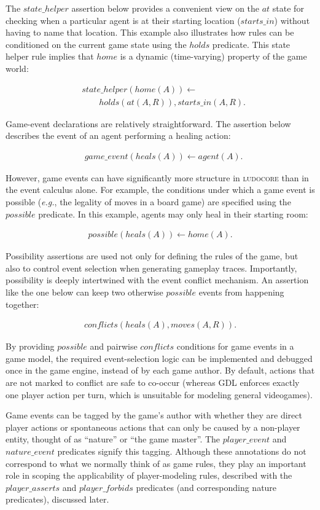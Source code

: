 \documentclass[conference]{IEEEtran}
\newcommand{\ludocore}{\textsc{ludocore}}
\newcommand{\snippet}[1]{{\vspace{-0.4cm}\begin{align*}#1\end{align*}\vspace{-0.4cm}}}
\newcommand{\logical}[1]{$#1$}
\begin{document}
The \logical{state\_helper} assertion below provides a convenient view on the
\logical{at} state for checking when a particular agent is at their starting
location (\logical{starts\_in}) without having to name that location. This
example also illustrates how rules can be conditioned on the current game state
using the \logical{holds} predicate. This state helper rule implies that
\logical{home} is a dynamic (time-varying) property of the game world:

\snippet{&state\_helper(home(A)) \leftarrow\\&\qquad holds(at(A,R)), starts\_in(A,R).}

Game-event declarations are relatively straightforward. The assertion below
describes the event of an agent performing a healing action:

\snippet{&game\_event(heals(A)) \leftarrow agent(A).}

However, game events can have significantly more structure in \ludocore{} than in
the event calculus alone. For example, the conditions under which a game event
is possible (\emph{e.g.}, the legality of moves in a board game) are specified
using the \logical{possible} predicate. In this example, agents may only
heal in their starting room:

\snippet{possible(heals(A)) \leftarrow home(A).}

Possibility assertions are used not only for defining the rules of the game,
but also to control event selection when generating gameplay traces.  Importantly,
possibility is deeply intertwined with the event conflict mechanism.  An
assertion like the one below can keep two otherwise \logical{possible} events
from happening together:

\snippet{conflicts(heals(A), moves(A,R)).}

By providing \logical{possible} and pairwise \logical{conflicts} conditions for
game events in a game model, the required event-selection logic can be
implemented and debugged once in the game engine, instead of by each game
author. By default, actions that are not marked to conflict are safe to
co-occur (whereas GDL enforces exactly one player action per turn, which is
unsuitable for modeling general videogames).

Game events can be tagged by the game's author with whether they are direct
player actions or spontaneous actions that can only be caused by a non-player
entity, thought of as ``nature'' or ``the game master''. The
\logical{player\_event} and \logical{nature\_event} predicates signify this
tagging. Although these annotations do not correspond to what we normally think
of as game rules, they play an important role in scoping the applicability of
player-modeling rules, described with the \logical{player\_asserts} and
\logical{player\_forbids} predicates (and corresponding nature predicates),
discussed later.
\end{document}

